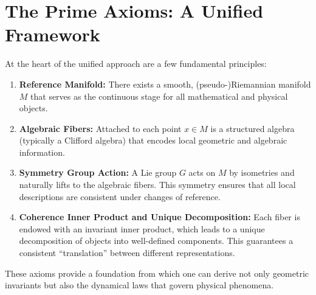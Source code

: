 \documentclass[12pt]{article}
\begin{document}
\section*{The Prime Axioms: A Unified Framework}
At the heart of the unified approach are a few fundamental principles:
\begin{enumerate}
    \item \textbf{Reference Manifold:} There exists a smooth, (pseudo-)Riemannian manifold \(M\) that serves as the continuous stage for all mathematical and physical objects.
    \item \textbf{Algebraic Fibers:} Attached to each point \(x \in M\) is a structured algebra (typically a Clifford algebra) that encodes local geometric and algebraic information.
    \item \textbf{Symmetry Group Action:} A Lie group \(G\) acts on \(M\) by isometries and naturally lifts to the algebraic fibers. This symmetry ensures that all local descriptions are consistent under changes of reference.
    \item \textbf{Coherence Inner Product and Unique Decomposition:} Each fiber is endowed with an invariant inner product, which leads to a unique decomposition of objects into well-defined components. This guarantees a consistent ``translation'' between different representations.
\end{enumerate}
These axioms provide a foundation from which one can derive not only geometric invariants but also the dynamical laws that govern physical phenomena.
\end{document}
